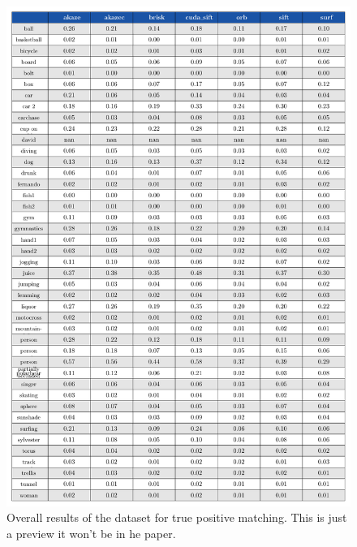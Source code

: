 \begin{figure}[t]
\centerline{%
		\includegraphics[width=0.98\linewidth]{tables/test.pdf}}
    \vspace{-2mm} 
	\caption{Overall results of the dataset for true positive matching. This is just a preview it won't be in he paper.}
	\label{fig:learnvsno}
\end{figure}

